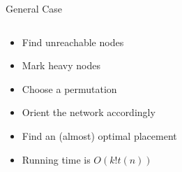 \begin{frame}{General Case}

\begin{columns}
\begin{column}{0.65\textwidth}
\begin{itemize}[<+>]
\item Find unreachable nodes
\item Mark heavy nodes
\item Choose a permutation
\item Orient the network accordingly 
\item Find an (almost) optimal placement
\item Running time is $O(k!t(n))$
\end{itemize}

\end{column}
\begin{column}{0.4\textwidth}
\begin{center}

\end{center}
\end{column}
\end{columns}

\end{frame}
